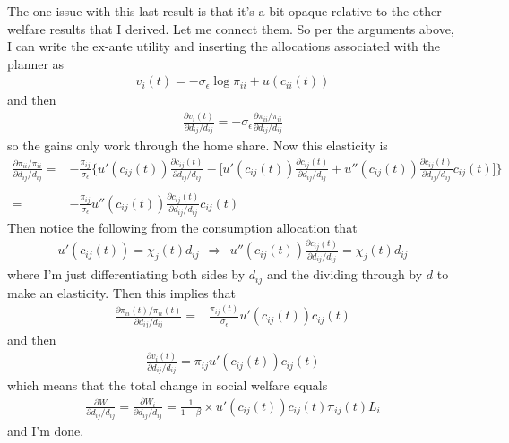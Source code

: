 \documentclass[12pt,pdftex]{article}
\begin{document}
\begin{onehalfspacing}
The one issue with this last result is that it's a bit opaque relative to the other welfare results that I derived. Let me connect them. So per the arguments above, I can write the ex-ante utility  and inserting the allocations associated with the planner as
\begin{align}
v_i(t) = -\sigma_{\epsilon} \log \pi_{ii} + u(c_{ii}(t))
\end{align}
and then
\begin{align}
\frac{\partial v_i(t)}{\partial d_{ij} / d_{ij}} = -\sigma_{\epsilon} \frac{\partial \pi_{ii} / \pi_{ii}}{\partial d_{ij} / d_{ij}}
\end{align}
so the gains only work through the home share. Now this elasticity is
\begin{align}
\frac{\partial \pi_{ii} / \pi_{ii}}{\partial d_{ij} / d_{ij}} =& -\frac{\pi_{ij}}{\sigma_{\epsilon}} \bigg \{ u'(c_{ij}(t))\frac{\partial c_{ij}(t)}{\partial d_{ij} / d_{ij}} - \bigg [u'(c_{ij}(t))\frac{\partial c_{ij}(t)}{\partial d_{ij} / d_{ij}} + u''(c_{ij}(t))\frac{\partial c_{ij}(t)}{\partial d_{ij} / d_{ij}}c_{ij}(t) \bigg ] \bigg \} \\
\nonumber \\
=& -\frac{\pi_{ij}}{\sigma_{\epsilon}}u''(c_{ij}(t))\frac{\partial c_{ij}(t)}{\partial d_{ij} / d_{ij}}c_{ij}(t)
\end{align}
Then notice the following from the consumption allocation that
\begin{align}
u'(c_{ij}(t) ) = \chi_{j}(t) d_{ij} \ \ \Rightarrow \ \ u''(c_{ij}(t))\frac{\partial c_{ij}(t)}{\partial d_{ij} / d_{ij}} = \chi_{j}(t)d_{ij}
\end{align}
where I'm just differentiating both sides by $d_{ij}$ and the dividing through by $d$ to make an elasticity. Then this implies that
\begin{align}
\frac{\partial \pi_{ii}(t) / \pi_{ii}(t)}{\partial d_{ij} / d_{ij}} =& \frac{\pi_{ij}(t)}{\sigma_{\epsilon}}u'(c_{ij}(t))c_{ij}(t)
\end{align}
and then
\begin{align}
\frac{\partial v_i(t)}{\partial d_{ij} / d_{ij}} = \pi_{ij}u'(c_{ij}(t))c_{ij}(t)
\end{align}
which means that the total change in social welfare equals
\begin{align}
\frac{\partial W}{\partial d_{ij} / d_{ij}} = \frac{\partial W_i}{\partial d_{ij} / d_{ij}} = \frac{1}{1-\beta} \times u'(c_{ij}(t)) c_{ij}(t) \pi_{ij}(t) L_i
\end{align}
and I'm done.


\end{onehalfspacing}
\end{document}
